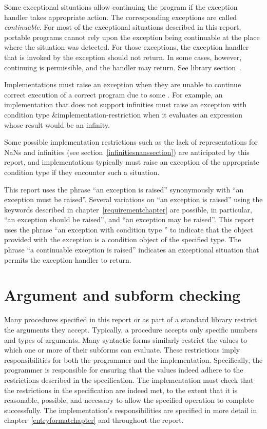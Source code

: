 Some exceptional situations allow continuing the program if the
exception handler takes appropriate action.  The corresponding
exceptions are called \textit{continuable}.
For most of the exceptional situations described in this report,
portable programs cannot rely upon the exception being continuable
at the place where the situation was detected.
For those exceptions, the exception handler that is invoked by the
exception should not return.
In some cases, however, continuing is permissible, and the
handler may return.  See library section~.

Implementations must raise an exception
when they are unable to continue correct execution
of a correct program due to some .  For
example, an implementation that does not support infinities
must raise an exception with condition type
{\cf\&implementation-restriction} when it evaluates an expression
whose result would be an infinity.

Some possible implementation restrictions such as the lack of
representations for NaNs and infinities (see
section~\ref{infinitiesnanssection}) are anticipated by this report,
and implementations typically must raise an exception of the
appropriate condition type if they encounter such a situation.

This report uses the phrase ``an exception is raised'' synonymously
with ``an exception must be raised''.  Several variations on ``an
exception is raised'' using the keywords described in
chapter~\ref{requirementchapter} are possible, in particular, ``an
exception should be raised'', and ``an exception may be raised''.
This report uses the phrase ``an exception with condition type ''
to indicate that the object provided with the
exception is a condition object of the specified type.
The phrase ``a continuable exception is raised'' indicates an
exceptional situation that permits the exception handler to return.

\section{Argument and subform checking}
\label{argumentcheckingsection}

Many procedures specified in this report or as part of a
standard library restrict the arguments they accept.
Typically, a procedure accepts only specific numbers and types of arguments.
Many syntactic forms similarly restrict the values to which one or
more of their subforms can evaluate.
These restrictions imply responsibilities for
both the programmer and the implementation.
Specifically, the programmer is responsible for ensuring
that the values indeed adhere to the restrictions described
in the specification.  The implementation must check
that the restrictions in the specification are indeed met, to the
extent that it is reasonable, possible, and necessary to allow the
specified operation to complete successfully.  The implementation's
responsibilities are specified in more detail in
chapter~\ref{entryformatchapter} and throughout the report.

